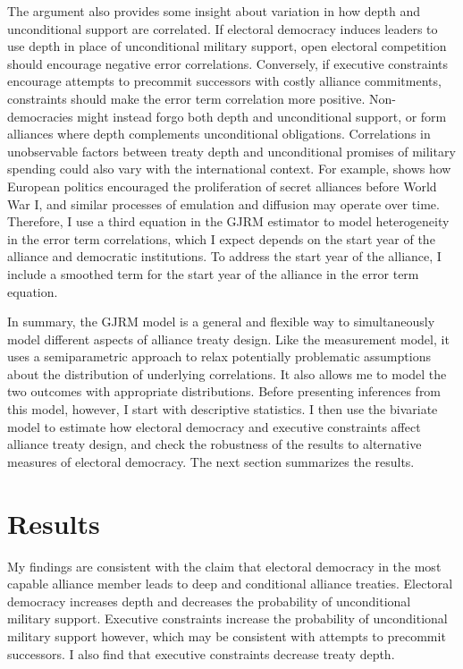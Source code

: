 \documentclass[12pt]{article}
\begin{document}
The argument also provides some insight about variation in how depth and unconditional support are correlated.  
If electoral democracy induces leaders to use depth in place of unconditional military support, open electoral competition should encourage negative error correlations. 
Conversely, if executive constraints encourage attempts to precommit successors with costly alliance commitments, constraints should make the error term correlation more positive.
Non-democracies might instead forgo both depth and unconditional support, or form alliances where depth complements unconditional obligations. 
Correlations in unobservable factors between treaty depth and unconditional promises of military spending could also vary with the international context.
For example, \citet{Kuo2019} shows how European politics encouraged the proliferation of secret alliances before World War I, and similar processes of emulation and diffusion may operate over time.
Therefore, I use a third equation in the GJRM estimator to model heterogeneity in the error term correlations, which I expect depends on the start year of the alliance and democratic institutions.
To address the start year of the alliance, I include a smoothed term for the start year of the alliance in the error term equation.  


In summary, the GJRM model is a general and flexible way to simultaneously model different aspects of alliance treaty design.
Like the measurement model, it uses a semiparametric approach to relax potentially problematic assumptions about the distribution of underlying correlations. 
It also allows me to model the two outcomes with appropriate distributions. 
Before presenting inferences from this model, however, I start with descriptive statistics. 
I then use the bivariate model to estimate how electoral democracy and executive constraints affect alliance treaty design, and check the robustness of the results to alternative measures of electoral democracy. 
The next section summarizes the results. 


\section{Results}


My findings are consistent with the claim that electoral democracy in the most capable alliance member leads to deep and conditional alliance treaties. 
Electoral democracy increases depth and decreases the probability of unconditional military support.
Executive constraints increase the probability of unconditional military support however, which may be consistent with attempts to precommit successors.
I also find that executive constraints decrease treaty depth.  
\end{document}

